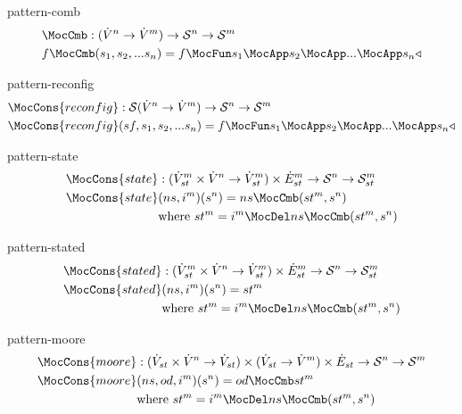 \documentclass[preview]{standalone}
\begin{document}
\begin{docimage}{pattern-comb}
  \begin{align*}%
    &\MocCmb :
      ({\dot{V}^n \rightarrow \dot{V}^m})
      \rightarrow \mathcal{S}^n \rightarrow \mathcal{S}^m \\
    &f \MocCmb (s_1,s_2,...s_n) =
      f \MocFun s_1 \MocApp s_2 \MocApp ... \MocApp s_n \triangleleft
  \end{align*}
\end{docimage}

\begin{docimage}{pattern-reconfig}
  \begin{align*}%
    & \MocCons{reconfig} :
      \mathcal{S}({\dot{V}^n \rightarrow \dot{V}^m})
      \rightarrow \mathcal{S}^n \rightarrow \mathcal{S}^m \\
    & \MocCons{reconfig}(sf,s_1,s_2,...s_n) =
      f \MocFun s_1 \MocApp s_2 \MocApp ... \MocApp s_n \triangleleft
  \end{align*}
\end{docimage}


\begin{docimage}{pattern-state}
  \begin{align*}%
    \MocCons{state} &:({\dot{V}^m_{st} \times  \dot{V}^n \rightarrow \dot{V}^m_{st}})
                      \times \dot{E}^m_{st}
                      \rightarrow \mathcal{S}^n \rightarrow \mathcal{S}^m_{st} \\
    \MocCons{state} &(ns,i^m)(s^n) = ns \MocCmb (st^m, s^n) \\
                    &\text{where}\ st^m = i^m \MocDel ns \MocCmb (st^m, s^n) 
  \end{align*}
\end{docimage}

\begin{docimage}{pattern-stated}
  \begin{align*}%
    \MocCons{stated} &:({\dot{V}^m_{st} \times  \dot{V}^n \rightarrow \dot{V}^m_{st}})
                      \times \dot{E}^m_{st}
                      \rightarrow \mathcal{S}^n \rightarrow \mathcal{S}^m_{st} \\
    \MocCons{stated} &(ns,i^m)(s^n) = st^m \\
                    &\text{where}\ st^m = i^m \MocDel ns \MocCmb (st^m, s^n) 
  \end{align*}
\end{docimage}

\begin{docimage}{pattern-moore}
  \begin{align*}%
    \MocCons{moore} &:({\dot{V}_{st} \times  \dot{V}^n \rightarrow \dot{V}_{st}})
                      \times ({\dot{V}_{st} \rightarrow \dot{V}^m})
                      \times \dot{E}_{st}
                      \rightarrow \mathcal{S}^n \rightarrow \mathcal{S}^m \\
    \MocCons{moore} &(ns,od,i^m)(s^n) = od \MocCmb st^m \\
                    &\text{where}\ st^m = i^m \MocDel ns \MocCmb (st^m, s^n) 
  \end{align*}
\end{docimage}
\end{document}
